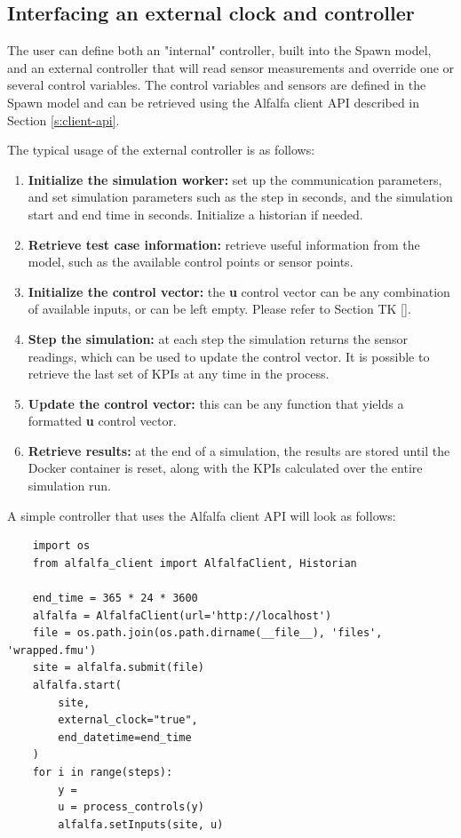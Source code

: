 \documentclass{article}
\begin{document}
\subsection{Interfacing an external clock and controller}\label{s:controllers}

The user can define both an "internal" controller, built into the Spawn model, and an external controller that will read sensor measurements and override one or several control variables. The control variables and sensors are defined in the Spawn model and can be retrieved using the Alfalfa client API described in Section \ref{s:client-api}.

The typical usage of the external controller is as follows:
\begin{enumerate}
    \item \textbf{Initialize the simulation worker:} set up the communication parameters, and set simulation parameters such as the step in seconds, and the simulation start and end time in seconds. Initialize a historian if needed.
    \item \textbf{Retrieve test case information:} retrieve useful information from the model, such as the available control points or sensor points.
    \item \textbf{Initialize the control vector:} the \textbf{u} control vector can be any combination of available inputs, or can be left empty. Please refer to Section TK \ref{}.
    \item \textbf{Step the simulation:} at each step the simulation returns the sensor readings, which can be used to update the control vector. It is possible to retrieve the last set of KPIs at any time in the process.
    \item \textbf{Update the control vector:} this can be any function that yields a formatted \textbf{u} control vector.
    \item \textbf{Retrieve results:} at the end of a simulation, the results are stored until the Docker container is reset, along with the KPIs calculated over the entire simulation run. 
\end{enumerate}

A simple controller that uses the Alfalfa client API will look as follows: 

\begin{verbatim}
    import os
    from alfalfa_client import AlfalfaClient, Historian
    
    end_time = 365 * 24 * 3600
    alfalfa = AlfalfaClient(url='http://localhost')
    file = os.path.join(os.path.dirname(__file__), 'files', 'wrapped.fmu') 
    site = alfalfa.submit(file)
    alfalfa.start(
        site,
        external_clock="true",
        end_datetime=end_time
    )
    for i in range(steps):
        y = 
        u = process_controls(y)
        alfalfa.setInputs(site, u)
    
\end{verbatim}
\end{document}
